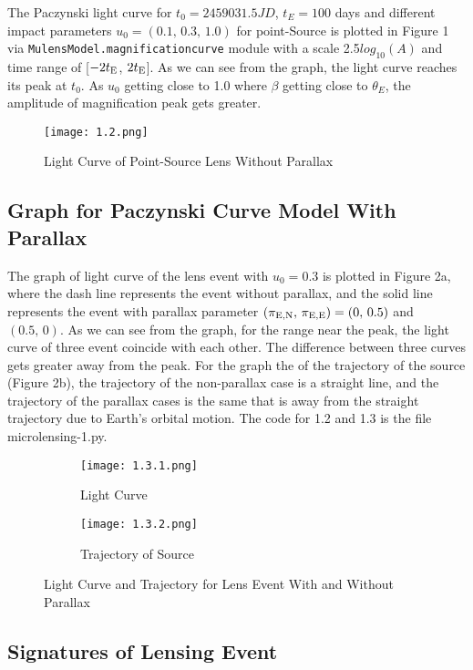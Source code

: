 \documentclass[preprint]{aastex63}
\begin{document}
The Paczynski light curve for $t_0=2459031.5JD$, $t_ E=100$ days and different impact parameters $u_0=(0.1,\,0.3,\,1.0)$ for point-Source is plotted in Figure 1 via \texttt{MulensModel.magnificationcurve} module \cite{Poleski_2019} with a scale 2.5$log_{10}(A)$ and time range of [$-2t_{\rm E}$, $2t_{\rm E}$].  As we can see from the graph, the light curve reaches its peak at $t_0$. As $u_0$ getting close to 1.0 where $\beta$ getting close to $\theta_E$, the amplitude of magnification peak gets greater.\clearpage

\begin{figure}[h]
\centering
\texttt{[image: 1.2.png]}
\caption{Light Curve of Point-Source Lens Without Parallax}
\label{fig 1}
\end{figure}

\bigskip
\subsection{Graph for Paczynski Curve Model With Parallax}
The graph of light curve of the lens event with $u_0=0.3$ is plotted in Figure 2a, where the dash line represents the event without parallax, and the solid line represents the event with parallax parameter $(\pi_{\rm E,N},\,\pi_{\rm E,E})=(0,\,0.5)$ and $(0.5,\,0)$. As we can see from the graph, for the range near the peak, the light curve of three event coincide with each other. The difference between three curves gets greater away from the peak. For the graph the of the trajectory of the source (Figure 2b), the trajectory of the non-parallax case is a straight line, and the trajectory of the parallax cases is the same that is away from the straight trajectory due to Earth's orbital motion. The code for 1.2 and 1.3 is the file microlensing-1.py.

\begin{figure}[h]
\centering
\begin{subfigure}{.49\textwidth}
  \centering
  \texttt{[image: 1.3.1.png]}
  \caption{Light Curve}
\end{subfigure}
 \begin{subfigure}{.49\textwidth}
  \centering
  \texttt{[image: 1.3.2.png]}
  \caption{Trajectory of Source}
 \end{subfigure}
\caption{Light Curve and Trajectory for Lens Event With and Without Parallax}
\label{fig 2}
\end{figure}

\bigskip
\subsection{Signatures of Lensing Event}
\end{document}
